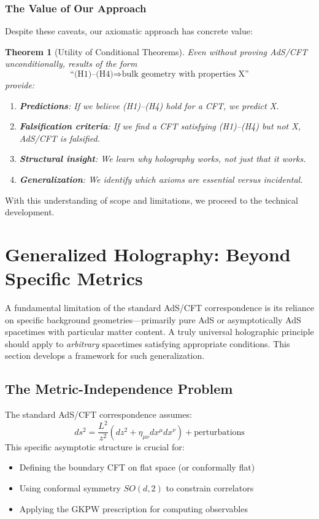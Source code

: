 \documentclass[12pt,a4paper]{article}
\newtheorem{theorem}{Theorem}[section]
\begin{document}
\subsubsection{The Value of Our Approach}

Despite these caveats, our axiomatic approach has concrete value:

\begin{theorem}[Utility of Conditional Theorems]\label{thm:utility}
Even without proving AdS/CFT unconditionally, results of the form
\[
\text{``(H1)--(H4)} \Rightarrow \text{bulk geometry with properties X''}
\]
provide:
\begin{enumerate}
    \item \textbf{Predictions}: If we believe (H1)--(H4) hold for a CFT, we predict X.
    \item \textbf{Falsification criteria}: If we find a CFT satisfying (H1)--(H4) but not X, AdS/CFT is falsified.
    \item \textbf{Structural insight}: We learn \emph{why} holography works, not just \emph{that} it works.
    \item \textbf{Generalization}: We identify which axioms are essential versus incidental.
\end{enumerate}
\end{theorem}

With this understanding of scope and limitations, we proceed to the technical development.

\section{Generalized Holography: Beyond Specific Metrics}

A fundamental limitation of the standard AdS/CFT correspondence is its reliance on specific background geometries---primarily pure AdS or asymptotically AdS spacetimes with particular matter content. A truly universal holographic principle should apply to \textit{arbitrary} spacetimes satisfying appropriate conditions. This section develops a framework for such generalization.

\subsection{The Metric-Independence Problem}

The standard AdS/CFT correspondence assumes:
\begin{equation}
ds^2 = \frac{L^2}{z^2}\left( dz^2 + \eta_{\mu\nu} dx^\mu dx^\nu \right) + \text{perturbations}
\end{equation}
This specific asymptotic structure is crucial for:
\begin{itemize}
    \item Defining the boundary CFT on flat space (or conformally flat)
    \item Using conformal symmetry $SO(d,2)$ to constrain correlators
    \item Applying the GKPW prescription for computing observables
\end{itemize}
\end{document}
